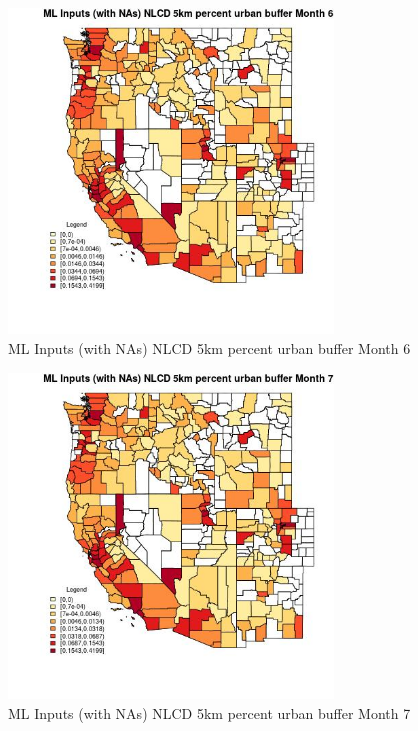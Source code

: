\begin{figure} 
\centering  
\includegraphics[width=0.77\textwidth]{Code_Outputs/Report_ML_input_PM25_Step4_part_f_de_duplicated_aveswNAs_CountyNLCD_5km_percent_urban_buffermedianMonth6.jpg} 
\caption{\label{fig:Report_ML_input_PM25_Step4_part_f_de_duplicated_aveswNAsCountyNLCD_5km_percent_urban_buffermedianMonth6}ML Inputs (with NAs) NLCD 5km percent urban buffer Month 6} 
\end{figure} 
 

\begin{figure} 
\centering  
\includegraphics[width=0.77\textwidth]{Code_Outputs/Report_ML_input_PM25_Step4_part_f_de_duplicated_aveswNAs_CountyNLCD_5km_percent_urban_buffermedianMonth7.jpg} 
\caption{\label{fig:Report_ML_input_PM25_Step4_part_f_de_duplicated_aveswNAsCountyNLCD_5km_percent_urban_buffermedianMonth7}ML Inputs (with NAs) NLCD 5km percent urban buffer Month 7} 
\end{figure} 
 


